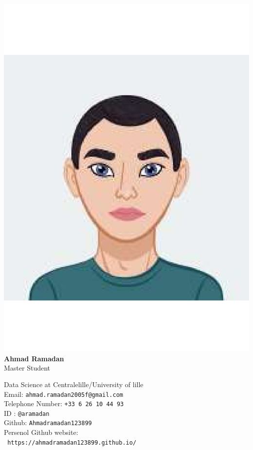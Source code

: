 \documentclass{article}
\begin{document}
\centering
\includegraphics[width=0.25\linewidth]{logo}\\[6pt]

{\Large \textbf{Ahmad Ramadan}}\\[-2pt]

\normalsize Master Student\\[6pt]

\vspace{0.3cm}


Data Science at Centralelille/University of lille\\[6pt]
\small
Email: 
\texttt{ahmad.ramadan2005f@gmail.com}\\[6pt]
Telephone Number:
\texttt{+33 6 26 10 44 93}\\[6pt]

ID : \texttt{@aramadan}\\[6pt]

Github:
\texttt{Ahmadramadan123899}\\[6pt]
Persenol Github website:\\[2pt]
\texttt{ https://ahmadramadan123899.github.io/}
\end{document}
